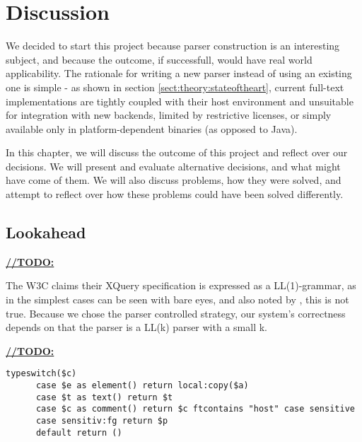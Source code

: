 \chapter{Discussion}
We decided to start this project because parser construction is an interesting
subject, and because the outcome, if successfull, would have real world
applicability. The rationale for writing a new parser instead of using an
existing one is simple - as shown in section \ref{sect:theory:stateoftheart},
current full-text implementations are tightly coupled with their
host environment and unsuitable for integration with new backends, limited by
restrictive licenses, or simply available only in platform-dependent binaries
(as opposed to Java). 

In this chapter, we will discuss the outcome of this project and reflect over
our decisions. We will present and evaluate alternative decisions, and what
might have come of them. We will also discuss problems, how they were
solved, and attempt to reflect over how these problems could have been solved
differently.



















\section{Lookahead}
\label{sect:discussion:lookahead}
\underline{\textbf{\LARGE //TODO:}}

The W3C claims their XQuery specification is expressed as a LL(1)-grammar\cite{createTokenizer}, as in the simplest cases can be seen with bare eyes, and also noted by \cite{kang_xquery_diglib}, this is not true. Because we chose the parser controlled strategy, our system's correctness depends on that the parser is a LL(k) parser with a small k.

\underline{\textbf{\LARGE //TODO:}}
\begin{verbatim}
typeswitch($c) 
      case $e as element() return local:copy($a)
      case $t as text() return $t
      case $c as comment() return $c ftcontains "host" case sensitive
      case sensitiv:fg return $p
      default return ()
\end{verbatim}



